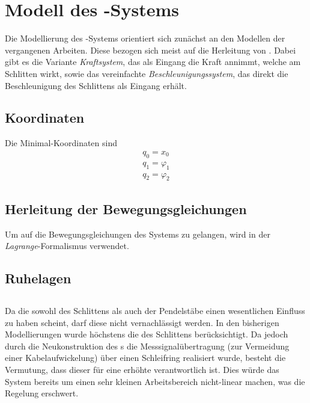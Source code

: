 \section{Modell des \spd-Systems}\label{sec:spdModell}


Die Modellierung des \spd-Systems orientiert sich zunächst an den Modellen der vergangenen Arbeiten. Diese bezogen sich meist auf die Herleitung von \cite{modpen}. Dabei gibt es die Variante \emph{Kraftsystem}, das als Eingang die Kraft annimmt, welche am Schlitten wirkt, sowie das vereinfachte \emph{Beschleunigungssystem}, das direkt die Beschleunigung des Schlittens als Eingang erhält.

\subsection{Koordinaten}


Die Minimal-Koordinaten sind 
\begin{align*}
	q_0 = x_0  \\
	q_1 = \varphi_1  \\
	q_2 = \varphi_2
\end{align*}

\subsection{Herleitung der Bewegungsgleichungen}

Um auf die Bewegungsgleichungen des Systems zu gelangen, wird in \cite{modpen} der \emph{Lagrange}-Formalismus verwendet.

\subsection{Ruhelagen}



\subsection{\crb}

Da die \crb sowohl des Schlittens als auch der Pendelstäbe einen wesentlichen Einfluss zu haben scheint, darf diese nicht vernachlässigt werden. In den bisherigen Modellierungen wurde höchstens die \crb des Schlittens berücksichtigt. Da jedoch durch die Neukonstruktion des \dpd s die Messsignalübertragung (zur Vermeidung einer Kabelaufwickelung) über einen Schleifring realisiert wurde, besteht die Vermutung, dass dieser für eine erhöhte \crb verantwortlich ist. Dies würde das System bereits um einen sehr kleinen Arbeitsbereich nicht-linear machen, was die Regelung erschwert.

